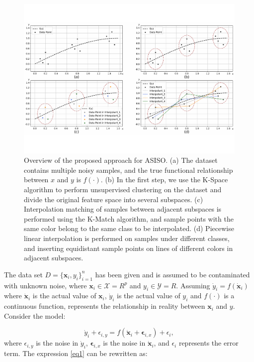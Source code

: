 \documentclass[sn-mathphys,Numbered]{sn-jnl}%
\theoremstyle{thmstyleone}%
\theoremstyle{thmstyletwo}%
\theoremstyle{thmstylethree}%
\begin{document}
\begin{figure}[H]%
\centering
\vspace{-1.6cm}   %
\setlength{\abovecaptionskip}{0.cm} %
\setlength{\abovecaptionskip}{-1.5cm} %
\includegraphics[width=1\textwidth]{fig1.pdf}
\caption{Overview of the proposed approach for ASISO. (a) The dataset contains multiple noisy samples, and the true functional relationship between $x$ and $y$ is $f(\cdot)$. (b) In the first step, we use the K-Space algorithm to perform unsupervised clustering on the dataset and divide the original feature space into several subspaces. (c) Interpolation matching of samples between adjacent subspaces is performed using the K-Match algorithm, and sample points with the same color belong to the same class to be interpolated. (d) Piecewise linear interpolation is performed on samples under different classes, and inserting equidistant sample points on lines of different colors in adjacent subspaces.}\label{fig1}
\end{figure}

The data set $D=\{\boldsymbol{x}_i,y_i\}_{i=1}^n$ has been given and is assumed to be contaminated with unknown noise, where $\boldsymbol{x}_i\in\mathcal{X}=R^p$ and $y_i\in\mathcal{Y}=R$. Assuming $\dot{y}_i=f(\dot{\boldsymbol{x}}_i)$ where $\dot{\boldsymbol{x}}_i$ is the actual value of $\boldsymbol{x}_i$, $\dot{y}_i$ is the actual value of $y_i$ and $f(\cdot)$ is a continuous function, represents the relationship in reality between $\boldsymbol{x}_i$ and $y$. Consider the model:

\begin{equation}
\dot{y}_i+\epsilon_{i,y}=f(\dot{\boldsymbol{x}}_i+\boldsymbol{\epsilon}_{i,x})+\epsilon_i,\label{eq1}
\end{equation}
where $\epsilon_{i,y}$ is the noise in $\dot{y}_i$, $\boldsymbol{\epsilon}_{i,x}$ is the noise in $\dot{\boldsymbol{x}}_i$, and $\epsilon_i$ represents the error term. The expression \eqref{eq1} can be rewritten as:
\end{document}

